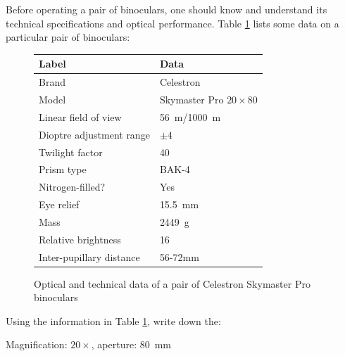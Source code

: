 \documentclass[a4paper,11pt,draft]{exam}
\begin{document}
\begin{questions}
\filbreak	
\question
	Before operating a pair of binoculars, one should know and understand its technical specifications and optical performance. Table \ref{q1e} lists some data on a particular pair of binoculars:
	\begin{figure}[H]
		\centering
		\begin{tabularx}{0.75\textwidth}{@{}Xl@{}}
			\toprule
			\textbf{Label}           & \textbf{Data}            \\ \midrule
			Brand                    & Celestron                \\
			Model                    & Skymaster Pro $ 20\times 80 $\\
			Linear field of view     & \SI{56}{\m}/\SI{1000}{\m}\\
			Dioptre adjustment range & $ \pm 4 $                \\
			Twilight factor          & 40                       \\
			Prism type               & BAK-4                    \\
			Nitrogen-filled?         & Yes                      \\
			Eye relief               & \SI{15.5}{\milli\m}      \\
			Mass                     & \SI{2449}{\g}            \\
			Relative brightness      & 16                       \\
			Inter-pupillary distance & 56-72mm                  \\ \bottomrule
		\end{tabularx}
		\renewcommand{\figurename}{Table}
		\caption{Optical and technical data of a pair of Celestron Skymaster Pro binoculars}
		\label{q1e}
	\end{figure}
	Using the information in Table \ref{q1e}, write down the:
	\begin{solution}
		Magnification: $ 20\times $, aperture: \SI{80}{\milli\metre}
	\end{solution}
	

\end{questions}
\end{document}
